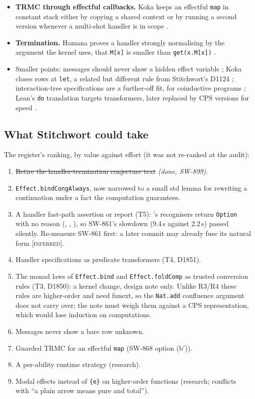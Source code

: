 \documentclass[11pt,a4paper]{article}
\newcommand{\code}[1]{\texttt{#1}}
\newcommand{\file}[1]{\path{#1}}
\newcommand{\inferred}{\textsc{[inferred]}}
\begin{document}
\begin{itemize}
  \item \textbf{TRMC through effectful callbacks.} Koka keeps an effectful \code{map} in
    constant stack either by copying a shared context or by running a second version whenever a
    multi-shot handler is in scope \cite{leijen2023trmc}.
  \item \textbf{Termination.} Hamana proves a handler strongly normalising by the argument
    the kernel uses, that \code{M[x]} is smaller than \code{get(x.M[x])} \cite{hamana2022modular}.
  \item Smaller points: messages should never show a hidden effect variable
    \cite{tang2025modal}; Koka closes rows at \code{let}, a related but different rule from
    Stitchwort's D1124 \cite{ikemori2022closed}; interaction-tree specifications are a
    further-off fit, for coinductive programs \cite{silver2023itree}; Lean's \code{do}
    translation targets transformers, later replaced by CPS versions for speed
    \cite{ullrich2022do}.
\end{itemize}

\subsection{What Stitchwort could take}
The register's ranking, by value against effort (it was not re-ranked at the audit):
\begin{enumerate}
  \item \sout{Retire the handler-termination conjecture text} \emph{(done, SW-899)}.
  \item \code{Effect.bindCongAlways}, now narrowed to a small std lemma for rewriting a
        continuation under a fact the computation guarantees.
  \item A handler fast-path assertion or report (T5): \file{crates/rt/src/fusion.rs}'s
        recognisers return \code{Option} with no reason (\file{fusion.rs:242}, \file{:269},
        \file{:482}), so SW-861's slowdown (9.4\,s against 2.2\,s) passed silently. Re-measure
        SW-861 first: a later commit may already fuse its natural form \inferred.
  \item Handler specifications as predicate transformers (T4, D1851).
  \item The monad laws of \code{Effect.bind} and \code{Effect.foldComp} as trusted conversion
        rules (T3, D1850): a kernel change, design note only. Unlike R3/R4 these rules are
        higher-order and need funext, so the \code{Nat.add} confluence argument does not carry
        over; the note must weigh them against a CPS representation, which would lose induction
        on computations.
  \item Messages never show a bare row unknown.
  \item Guarded TRMC for an effectful \code{map} (SW-868 option (b$'$)).
  \item A per-ability runtime strategy (research).
  \item Modal effects instead of \code{\{e\}} on higher-order functions (research; conflicts
        with ``a plain arrow means pure and total'').
\end{enumerate}
\end{document}
